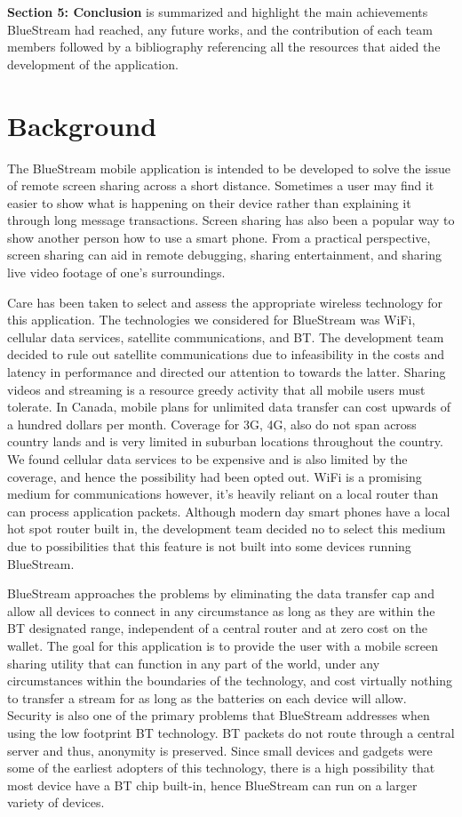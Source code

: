 \documentclass[a4paper,12pt]{article}
\begin{document}
\noindent\textbf{Section 5: Conclusion} is summarized and highlight the main achievements BlueStream had reached, any future works, and the contribution of each team members followed by a bibliography referencing all the resources that aided the development of the application.



\section{Background}
The BlueStream mobile application is intended to be developed to solve the issue of remote screen sharing across a short distance. Sometimes a user may find it easier to show what is happening on their device rather than explaining it through long message transactions. Screen sharing has also been a popular way to show another person how to use a smart phone. From a practical perspective, screen sharing can aid in remote debugging, sharing entertainment, and sharing live video footage of one’s surroundings. 

Care has been taken to select and assess the appropriate wireless technology for this application. The technologies we considered for BlueStream was WiFi, cellular data services, satellite communications, and BT. The development team decided to rule out satellite communications due to infeasibility in the costs and latency in performance and directed our attention to towards the latter. Sharing videos and streaming is a resource greedy activity that all mobile users must tolerate. In Canada, mobile plans for unlimited data transfer can cost upwards of a hundred dollars per month. Coverage for 3G, 4G, also do not span across country lands and is very limited in suburban locations throughout the country. We found cellular data services to be expensive and is also limited by the coverage, and hence the possibility had been opted out. WiFi is a promising medium for communications however, it’s heavily reliant on a local router than can process application packets. Although modern day smart phones have a local hot spot router built in, the development team decided no to select this medium due to possibilities that this feature is not built into some devices running BlueStream.

BlueStream approaches the problems by eliminating the data transfer cap and allow all devices to connect in any circumstance as long as they are within the BT designated range, independent of a central router and at zero cost on the wallet. The goal for this application is to provide the user with a mobile screen sharing utility that can function in any part of the world, under any circumstances within the boundaries of the technology, and cost virtually nothing to transfer a stream for as long as the batteries on each device will allow. Security is also one of the primary problems that BlueStream addresses when using the low footprint BT technology. BT packets do not route through a central server and thus, anonymity is preserved. Since small devices and gadgets were some of the earliest adopters of this technology, there is a high possibility that most device have a BT chip built-in, hence BlueStream can run on a larger variety of devices. 
\end{document}
